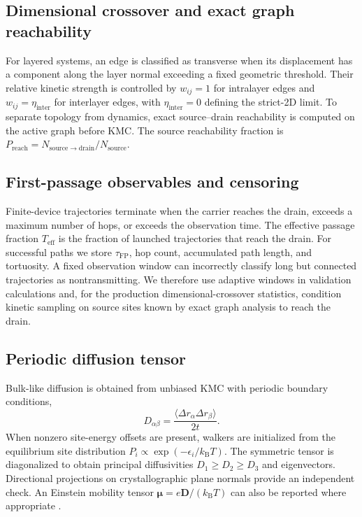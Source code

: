 \documentclass[aps,prmaterials,reprint,amsmath,amssymb,superscriptaddress,longbibliography]{revtex4-2}
\newcommand{\Teff}{T_{\mathrm{eff}}}
\newcommand{\taufp}{\tau_{\mathrm{FP}}}
\newcommand{\etaperp}{\eta_{\mathrm{inter}}}
\newcommand{\kb}{k_{\mathrm B}}
\begin{document}
\subsection{Dimensional crossover and exact graph reachability}
For layered systems, an edge is classified as transverse when its displacement has a component along the layer normal exceeding a fixed geometric threshold. Their relative kinetic strength is controlled by $w_{ij}=1$ for intralayer edges and $w_{ij}=\etaperp$ for interlayer edges, with $\etaperp=0$ defining the strict-2D limit. To separate topology from dynamics, exact source--drain reachability is computed on the active graph before KMC. The source reachability fraction is $P_{\mathrm{reach}}=N_{\mathrm{source}\rightarrow\mathrm{drain}}/N_{\mathrm{source}}$.

\subsection{First-passage observables and censoring}
Finite-device trajectories terminate when the carrier reaches the drain, exceeds a maximum number of hops, or exceeds the observation time. The effective passage fraction $\Teff$ is the fraction of launched trajectories that reach the drain. For successful paths we store $\taufp$, hop count, accumulated path length, and tortuosity. A fixed observation window can incorrectly classify long but connected trajectories as nontransmitting. We therefore use adaptive windows in validation calculations and, for the production dimensional-crossover statistics, condition kinetic sampling on source sites known by exact graph analysis to reach the drain.

\subsection{Periodic diffusion tensor}
Bulk-like diffusion is obtained from unbiased KMC with periodic boundary conditions,
\begin{equation}D_{\alpha\beta}=\frac{\langle\Delta r_\alpha\Delta r_\beta\rangle}{2t}.\end{equation}
When nonzero site-energy offsets are present, walkers are initialized from the equilibrium site distribution $P_i\propto\exp(-\epsilon_i/\kb T)$. The symmetric tensor is diagonalized to obtain principal diffusivities $D_1\geq D_2\geq D_3$ and eigenvectors. Directional projections on crystallographic plane normals provide an independent check. An Einstein mobility tensor $\bm\mu=e\mathbf D/(\kb T)$ can also be reported where appropriate \cite{baranovskii1996}.
\end{document}
